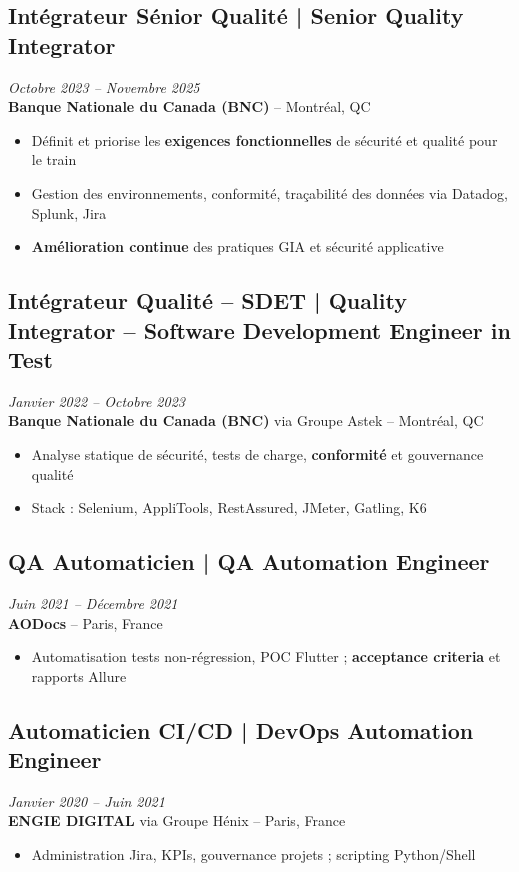 \documentclass[11pt,a4paper]{article}
\begin{document}
\subsection*{Intégrateur Sénior Qualité | Senior Quality Integrator} \hfill \textit{Octobre 2023 -- Novembre 2025}\\
\textbf{Banque Nationale du Canada (BNC)} -- Montréal, QC\\
\begin{itemize}
    \item Définit et priorise les \textbf{exigences fonctionnelles} de sécurité et qualité pour le train
    \item Gestion des environnements, conformité, traçabilité des données via Datadog, Splunk, Jira
    \item \textbf{Amélioration continue} des pratiques GIA et sécurité applicative
\end{itemize}

\subsection*{Intégrateur Qualité -- SDET | Quality Integrator -- Software Development Engineer in Test} \hfill \textit{Janvier 2022 -- Octobre 2023}\\
\textbf{Banque Nationale du Canada (BNC)} via Groupe Astek -- Montréal, QC\\
\begin{itemize}
    \item Analyse statique de sécurité, tests de charge, \textbf{conformité} et gouvernance qualité
    \item Stack : Selenium, AppliTools, RestAssured, JMeter, Gatling, K6
\end{itemize}

\subsection*{QA Automaticien | QA Automation Engineer} \hfill \textit{Juin 2021 -- Décembre 2021}\\
\textbf{AODocs} -- Paris, France\\
\begin{itemize}
    \item Automatisation tests non-régression, POC Flutter ; \textbf{acceptance criteria} et rapports Allure
\end{itemize}

\subsection*{Automaticien CI/CD | DevOps Automation Engineer} \hfill \textit{Janvier 2020 -- Juin 2021}\\
\textbf{ENGIE DIGITAL} via Groupe Hénix -- Paris, France\\
\begin{itemize}
    \item Administration Jira, KPIs, gouvernance projets ; scripting Python/Shell
\end{itemize}
\end{document}
